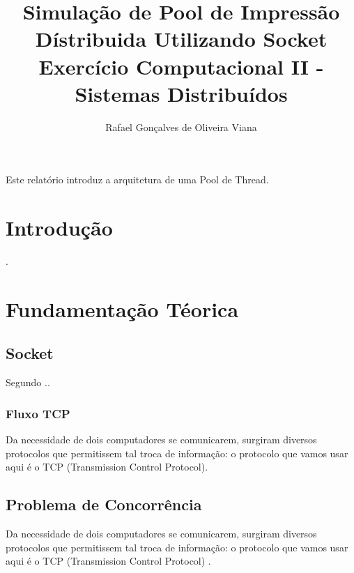 \documentclass[12pt]{article}
\title{ Simulação de Pool de Impressão Dístribuida Utilizando Socket \\ Exercício Computacional II - Sistemas Distribuídos}
\author{Rafael Gonçalves de Oliveira Viana\inst{1}  }
\begin{document}
 

\maketitle

     
\begin{resumo} 	
  Este relatório introduz a arquitetura de uma Pool de Thread.
\end{resumo}

\section{Introdução}
 \cite{webservece}.
 
\section{Fundamentação Téorica} 

\subsection{Socket}
 Segundo \cite{socket}.\cite{conc}.
 
\subsubsection{Fluxo TCP}
 Da necessidade de dois computadores se comunicarem, surgiram diversos protocolos que permitissem tal troca de informação: o protocolo que vamos usar aqui é o TCP (Transmission Control Protocol).
\subsection{Problema de Concorrência}
 Da necessidade de dois computadores se comunicarem, surgiram diversos protocolos que permitissem tal troca de informação: o protocolo que vamos usar aqui é o TCP (Transmission Control Protocol) \cite{conc}.
\end{document}
